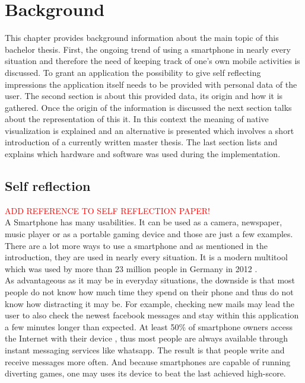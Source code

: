 \chapter{Background}
\label{cha:background}
This chapter provides background information about the main topic of this bachelor thesis. First, the ongoing trend of using a smartphone in nearly every situation and therefore the need of keeping track of one's own mobile activities is discussed. To grant an application the possibility to give self reflecting impressions the application itself needs to be provided with personal data of the user. The second section is about this provided data, its origin and how it is gathered. Once the origin of the information is discussed the next section talks about the representation of this it. In this context the meaning of native visualization is explained and an alternative is presented which involves a short introduction of a currently written master thesis. The last section lists and explains which hardware and software was used during the implementation.

\section{Self reflection}
\textcolor{red}{ADD REFERENCE TO SELF REFLECTION PAPER!}\\
A Smartphone has many usabilities. It can be used as a camera, newspaper, music player or as a portable gaming device and those are just a few examples. There are a lot more ways to use a smartphone and as mentioned in the introduction, they are used in nearly every situation. It is a modern multitool which was used by more than 23 million people in Germany in 2012 \cite{gstatistic}.\\
As  advantageous as it may be in everyday situations, the downside is that most people do not know how much time they spend on their phone and thus do not know how distracting it may be.
For example, checking new mails may lead the user to also check the newest facebook messages and stay within this application a few minutes longer than expected. At least 50\% of smartphone owners access the Internet with their device \cite{gstatistic}, thus most people are always available through instant messaging services like whatsapp. The result is that people write and receive messages more often. And because smartphones are capable of running diverting games, one may uses its device to beat the last achieved high-score.

